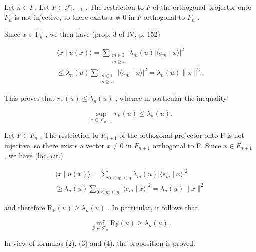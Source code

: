Let \(n \in I\) . Let \(F \in \mathcal{F}_{n+1}\) . The restriction to \(F\) of the orthogonal projector onto \(F_n\) is not injective, so there exists \(x \neq 0\) in \(F\) orthogonal to \(F_n\) .

Since \(x \in \mathrm{F}_{n}^{\circ}\) , we then have (prop. 3 of IV, p. 152)

\[
\begin{array}{l}\langle x\mid u(x)\rangle = \sum_{\substack{m\in \mathrm{I}\\ m\geqslant n}}\lambda_{m}(u)|\langle e_{m}\mid x\rangle |^{2}\\ \leqslant \lambda_{n}(u)\sum_{\substack{m\in \mathrm{I}\\ m\geqslant n}}|\langle e_{m}\mid x\rangle |^{2} = \lambda_{n}(u)\| x\|^{2}. \end{array}
\]

This proves that \(r_{\mathrm{F}}(u)\leqslant\lambda_{n}(u)\) , whence in particular the inequality

\[
\sup _ {\mathrm{F} \in \mathscr {F} _ {n + 1}} r _ {\mathrm{F}} (u) \leqslant \lambda_ {n} (u).\tag{3}
\]

Let \(F \in F_{n}\) . The restriction to \(F_{n+1}\) of the orthogonal projector onto F is not injective, so there exists a vector \(x \neq 0\) in \(F_{n+1}\) orthogonal to F. Since \(x \in F_{n+1}\) , we have (loc. cit.)

\[
\begin{array}{c} \langle x \mid u (x) \rangle = \sum_ {0 \leqslant m \leqslant n} \lambda_ {m} (u) | \langle e _ {m} \mid x \rangle | ^ {2} \\ \geqslant \lambda_ {n} (u) \sum_ {0 \leqslant m \leqslant n} | \langle e _ {m} \mid x \rangle | ^ {2} = \lambda_ {n} (u) \| x \| ^ {2} \end{array}
\]

and therefore \(\mathrm{R_F}(u) \geqslant \lambda_n(u)\) . In particular, it follows that

\[
\inf _ {\mathrm{F} \in \mathcal {F} _ {n}} \mathrm{R} _ {\mathrm{F}} (u) \geqslant \lambda_ {n} (u).\tag{4}
\]

In view of formulas (2), (3) and (4), the proposition is proved.

